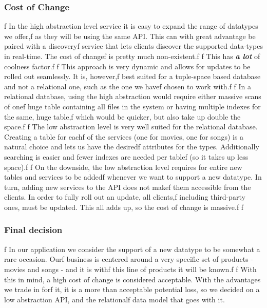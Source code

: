 \subsubsection{Cost of Change}f
In the high abstraction level service it is easy to expand the range of datatypes we offer,f
as they will be using the same API. This can with great advantage be paired with a discoveryf
service that lets clients discover the supported data-types in real-time. The cost of changef
is pretty much non-existent.f
f
This has \textbf{\emph{a lot}} of coolness factor.f
f
This approach is very dynamic and allows for updates to be rolled out seamlessly. It is, however,f
best suited for a tuple-space based database and not a relational one, such as the one we havef
chosen to work with.f
f
In a relational database, using the high abstraction would require either massive scans of onef
huge table containing all files in the system or having multiple indexes for the same, huge table,f
which would be quicker, but also take up double the space.f
f
The low abstraction level is very well suited for the relational database. Creating a table for eachf
of the services (one for movies, one for songs) is a natural choice and lets us have the desiredf
attributes for the types. Additionally searching is easier and fewer indexes are needed per tablef
(so it takes up less space).f
f
On the downside, the low abstraction level requires for entire new tables and services to be addedf
whenever we want to support a new datatype. In turn, adding new services to the API does not makef
them accessible from the clients. In order to fully roll out an update, all clients,f
including third-party ones, must be updated. This all adds up, so the cost of change is massive.f
f
\subsubsection{Final decision}f
In our application we consider the support of a new datatype to be somewhat a rare occasion. Ourf
business is centered around a very specific set of products - movies and songs - and it is withf
this line of products it will be known.f
f
With this in mind, a high cost of change is considered acceptable. With the advantages we trade in forf
it, it is a more than acceptable potential loss, so we decided on a low abstraction API, and the relationalf
data model that goes with it.
